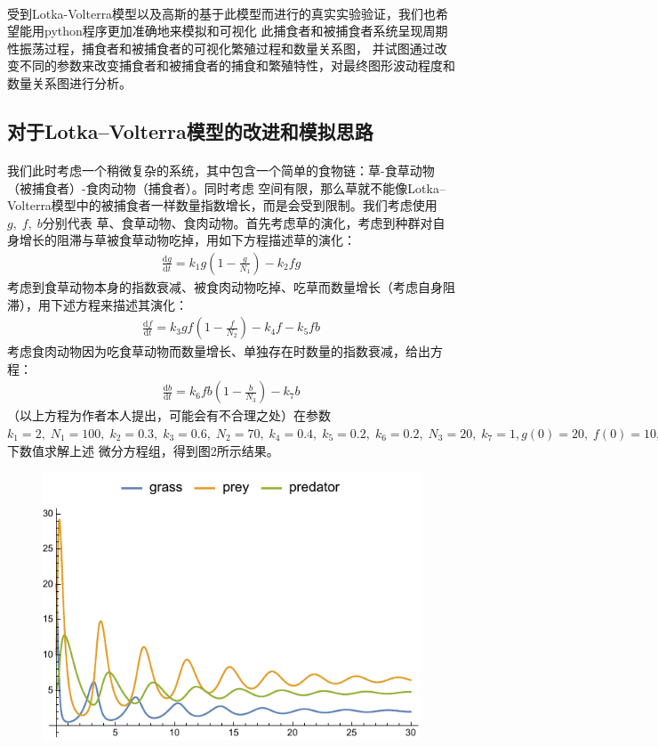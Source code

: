 \documentclass[a4paper]{ctexart}
\def\d{\mathrm{d}}
\begin{document}
	\paragraph{}
	受到Lotka-Volterra模型以及高斯的基于此模型而进行的真实实验验证，我们也希望能用python程序更加准确地来模拟和可视化
	此捕食者和被捕食者系统呈现周期性振荡过程，捕食者和被捕食者的可视化繁殖过程和数量关系图，
	并试图通过改变不同的参数来改变捕食者和被捕食者的捕食和繁殖特性，对最终图形波动程度和数量关系图进行分析。
	\subsection{\large{对于Lotka–Volterra模型的改进和模拟思路}}
		\paragraph{}
		我们此时考虑一个稍微复杂的系统，其中包含一个简单的食物链：草-食草动物（被捕食者）-食肉动物（捕食者）。同时考虑
		空间有限，那么草就不能像Lotka–Volterra模型中的被捕食者一样数量指数增长，而是会受到限制。我们考虑使用$g,\;f,\;b$分别代表
		草、食草动物、食肉动物。首先考虑草的演化，考虑到种群对自身增长的阻滞与草被食草动物吃掉，用如下方程描述草的演化：
		\begin{align}
			\frac{\d g}{\d t} = k_{1}g\left(1-\frac{g}{N_{1}}\right) - k_{2}fg
		\end{align}
		考虑到食草动物本身的指数衰减、被食肉动物吃掉、吃草而数量增长（考虑自身阻滞），用下述方程来描述其演化：
		\begin{align}
			\frac{\d f}{\d t} = k_{3}gf\left(1 - \frac{f}{N_{2}}\right) - k_{4}f - k_{5}fb
		\end{align}
		考虑食肉动物因为吃食草动物而数量增长、单独存在时数量的指数衰减，给出方程：
		\begin{align}
			\frac{\d b}{\d t} = k_{6}fb\left(1 - \frac{b}{N_{3}}\right) - k_{7}b
		\end{align}
		（以上方程为作者本人提出，可能会有不合理之处）在参数$k_{1} = 2,\;N_{1} = 100,\;k_{2} = 0.3,\;k_{3} = 0.6,\;N_{2} = 70, \;k_{4} = 0.4,\;k_{5} = 0.2,\;k_{6} = 0.2,\;N_{3} = 20,\;k_{7} = 1, g(0)=20,\;f(0)=10,\;b(0)=5$下数值求解上述
		微分方程组，得到图2所示结果。
		\begin{figure}[htbp]
			\centering
			\includegraphics[scale=0.90]{mymodel.pdf}
			\caption{}
		\end{figure}
\end{document}
